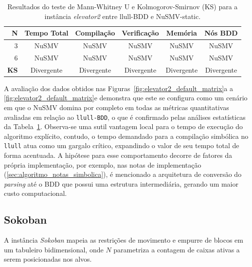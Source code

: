 \documentclass[cic,tc]{infufrgs}
\begin{document}
	\begin{table}[htbp]
		\centering
		\caption{Resultados do teste de Mann-Whitney U e Kolmogorov-Smirnov (KS) para a instância \textit{elevator2} entre llull-BDD e NuSMV-static.}
		\label{tab:estatistica_elevator_default}
		\small
		\begin{tabular}{rccccc}
			\toprule
			\textbf{N} & \textbf{Tempo Total} & \textbf{Compilação} & \textbf{Verificação} & \textbf{Memória} & \textbf{Nós BDD} \\
			\midrule
			3 & NuSMV & NuSMV & NuSMV & NuSMV & NuSMV \\
			6 & NuSMV & NuSMV & NuSMV & NuSMV & NuSMV \\
			\midrule
			\textbf{KS} & Divergente & Divergente & Divergente & Divergente & Divergente \\
			\bottomrule
		\end{tabular}
	\end{table}
	\FloatBarrier
	A avaliação dos dados obtidos nas Figuras~\ref{fig:elevator2_default_matrix}a a \ref{fig:elevator2_default_matrix}e demonstra que este se configura como um cenário em que o NuSMV domina por completo em todas as métricas quantitativas avaliadas em relação ao \texttt{llull-BDD}, o que é confirmado pelas análises estatísticas da Tabela~\ref{tab:estatistica_elevator_default}. Observa-se uma sutil vantagem local para o tempo de execução do algoritmo explícito, contudo, o tempo demandado para a compilação simbólica no \texttt{llull} atua como um gargalo crítico, expandindo o valor de seu tempo total de forma acentuada. A hipótese para esse comportamento decorre de fatores da própria implementação, por exemplo, nas notas de implementação (\autoref{sec:algoritmo_notas_simbolica}), é mencionado a arquitetura de conversão do \textit{parsing} até o BDD que possui uma estrutura intermediária, gerando um maior custo computacional.
	
	\subsection{Sokoban}
	\label{sec:res_sokoban}
	
	A instância \textit{Sokoban} mapeia as restrições de movimento e empurre de blocos em um tabuleiro bidimensional, onde $N$ parametriza a contagem de caixas ativas a serem posicionadas nos alvos.
	
\end{document}
